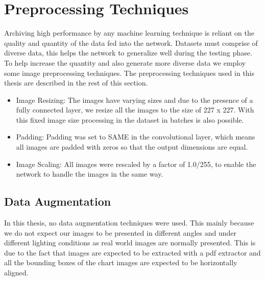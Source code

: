 \documentclass[12pt, a4paper,oneside]{report}
\begin{document}
\section{Preprocessing Techniques}
Archiving high performance by any machine learning technique is reliant on the quality and quantity of the data fed into the network. Datasets must comprise of diverse data, this helps the network to generalize well during the testing phase. To help increase the quantity and also generate more diverse data we employ some image preprocessing techniques. The preprocessing techniques used in this thesis are described in the rest of this section.

\begin{itemize}
	\item  Image Resizing: The images have varying sizes and due to the presence of a fully connected layer, we resize all the images to the size of 227 x 227. With this fixed image size processing in the dataset in batches is also possible.
	
	\item  Padding: Padding was set to SAME in the convolutional layer, which means all images are padded with zeros so that the output dimensions are equal.
	
	\item  Image Scaling: All images were rescaled by a factor of 1.0/255, to enable the network to handle the images in the same way.
\end{itemize}

\subsection{Data Augmentation}
In this thesis, no data augmentation techniques were used. This mainly because we do not expect our images to be presented in different angles and under different lighting conditions as real world images are normally presented. This is due to the fact that images are expected to be extracted with a pdf extractor and all the bounding boxes of the chart images are expected to be horizontally aligned.  
\end{document}
